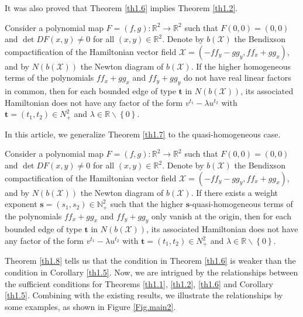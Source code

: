\documentclass[reqno]{amsart}
\begin{document}
It was also  proved that Theorem \ref{th1.6}  implies Theorem \ref{th1.2}.

\begin{theorem} \label{th1.7}
Consider a polynomial map $ F=(f, g):\mathbb{R}^2 \to \mathbb{R}^2 $ such that 
$ F(0,0)=(0,0) $ and $ \det DF(x,y)\neq 0 $ for all $ (x,y)\in \mathbb{R}^2 $. 
Denote by $ b(\mathcal{X}) $ the Bendixson compactification of the Hamiltonian vector 
field $ \mathcal{X}=(-ff_{y}-gg_{y}, ff_{x}+gg_{x})$, and by $ N(b(\mathcal{X})) $ 
the Newton diagram of $ b(\mathcal{X}) $. If the higher homogeneous terms of the 
polynomials $ ff_{x}+gg_{x} $ and $ ff_{y}+gg_{y} $ do not have real linear factors 
in common, then for each bounded edge of type $ \mathbf{t} $ in $ N(b(\mathcal{X})) $, 
its associated Hamiltonian does not have any factor of the form 
$ v^{t_1}-\lambda u^{t_2} $ with $ \mathbf{t}=(t_{1},t_{2})\in N_{+}^{2} $ and 
$ \lambda \in \mathbb{R}\backslash \left\{0\right\}$.
\end{theorem}

In this article, we generalize Theorem \ref{th1.7} to the quasi-homogeneous case.

\begin{theorem}\label{th1.8}
Consider a polynomial map $ F=(f,g):\mathbb{R}^2 \to \mathbb{R}^2 $ such that 
$ F(0,0)=(0,0) $ and $ \det DF(x,y)\neq 0 $ for all $ (x,y)\in \mathbb{R}^2 $. 
Denote by $ b(\mathcal{X}) $ the Bendixson compactification of the Hamiltonian vector 
field $ \mathcal{X}=(-ff_{y}-gg_{y}, ff_{x}+gg_{x}) $, and by $ N(b(\mathcal{X})) $ 
the Newton diagram of $ b(\mathcal{X}) $. If there exists a weight exponent 
$\mathbf{s}=(s_1,s_2)\in \mathbb{N}_{+}^{2}$ such that the higher 
$\mathbf{s}$-quasi-homogeneous terms of the polynomials $ ff_{x}+gg_{x} $ and 
$ ff_{y}+gg_{y} $ only vanish at the origin, then for each bounded edge of type 
$ \mathbf{t} $ in $ N(b(\mathcal{X})) $, its associated Hamiltonian does not have any 
factor of the form $ v^{t_1}-\lambda u^{t_2} $ with 
$ \mathbf{t}=(t_{1},t_{2})\in N_{+}^{2} $ and 
$ \lambda \in \mathbb{R}\backslash \left\{0\right\} $.
\end{theorem}

Theorem \ref{th1.8} tells us that the condition in Theorem \ref{th1.6} is weaker than 
the condition in Corollary \ref{th1.5}. Now, we are intrigued by the relationships 
between the sufficient conditions for Theorems \ref{th1.1}, \ref{th1.2}, \ref{th1.6} 
and Corollary \ref{th1.5}.  Combining with the existing results, we illustrate the 
relationships by some examples, as shown in Figure \ref{Fig.main2}.
\end{document}
